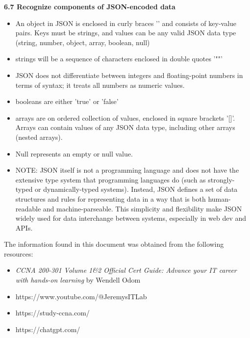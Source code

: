 \documentclass{article}
\begin{document}
\textbf{6.7 Recognize components of JSON-encoded data}
\begin{itemize}
\item An object in JSON is enclosed in curly braces '{}' and consists of key-value pairs. Keys must be strings, and values can be any valid JSON data type (string, number, object, array, boolean, null)
\item strings will be a sequence of characters enclosed in double quotes '""'
\item JSON does not differentiate between integers and floating-point numbers in terms of syntax; it treats all numbers as numeric values.
\item booleans are either 'true' or 'false' 	
\item arrays are on ordered collection of values, enclosed in square brackets '[]'. Arrays can contain values of any JSON data type, including other arrays (nested arrays).
\item Null represents an empty or null value.
\item NOTE: JSON itself is not a programming language and does not have the extensive type system that programming languages do (such as strongly-typed or dynamically-typed systems). Instead, JSON defines a set of data structures and rules for representing data in a way that is both human-readable and machine-parseable. This simplicity and flexibility make JSON widely used for data interchange between systems, especially in web dev and APIs.
\end{itemize}

\newpage
The information found in this document was obtained from the following resources:
\begin{itemize}
\item\textit{CCNA 200-301 Volume 1\&2 Official Cert Guide: Advance your IT career with hands-on learning} by Wendell Odom
\item https://www.youtube.com/@JeremysITLab
\item https://study-ccna.com/
\item https://chatgpt.com/\\
\end{itemize}
\end{document}
